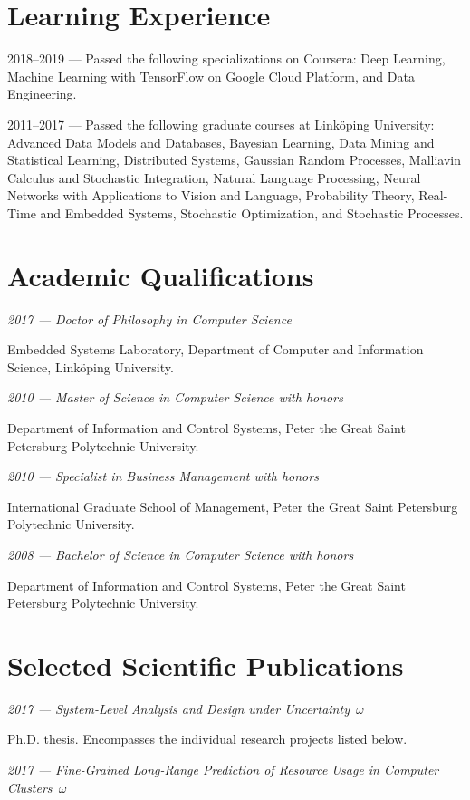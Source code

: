 \documentclass[journal]{IEEEtran}
\begin{document}
\section{Learning Experience}
2018--2019 --- Passed the following specializations on Coursera: Deep Learning,
Machine Learning with TensorFlow on Google Cloud Platform, and Data Engineering.

2011--2017 --- Passed the following graduate courses at Linköping University:
Advanced Data Models and Databases, Bayesian Learning, Data Mining and
Statistical Learning, Distributed Systems, Gaussian Random Processes, Malliavin
Calculus and Stochastic Integration, Natural Language Processing, Neural
Networks with Applications to Vision and Language, Probability Theory, Real-Time
and Embedded Systems, Stochastic Optimization, and Stochastic Processes.

\section{Academic Qualifications}
\emph{2017 --- Doctor of Philosophy in Computer Science}

Embedded Systems Laboratory, Department of Computer and Information Science,
Linköping University.

\emph{2010 --- Master of Science in Computer Science with honors}

Department of Information and Control Systems, Peter the Great Saint Petersburg
Polytechnic University.

\emph{2010 --- Specialist in Business Management with honors}

International Graduate School of Management, Peter the Great Saint Petersburg
Polytechnic University.

\emph{2008 --- Bachelor of Science in Computer Science with honors}

Department of Information and Control Systems, Peter the Great Saint Petersburg
Polytechnic University.

\section{Selected Scientific Publications}
\emph{2017 --- System-Level Analysis and Design under Uncertainty~$\omega$}

Ph.D. thesis. Encompasses the individual research projects listed below.

\emph{2017 --- Fine-Grained Long-Range Prediction of Resource Usage in Computer
Clusters~$\omega$}
\end{document}
